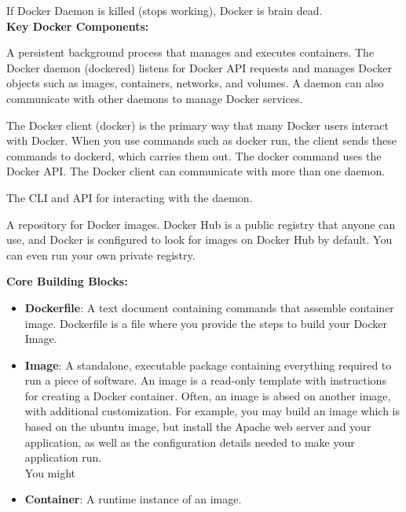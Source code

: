 \documentclass{article}
\begin{document}
If Docker Daemon is killed (stops working), Docker is brain dead. \\
\textbf{Key Docker Components:} 

\begin{tcolorbox}[colback=red!5!white, colframe=red!50!black,title=Docker Daemon]
    A persistent background process that manages and executes containers. The Docker daemon (dockered) listens for Docker API requests and manages Docker objects such as images, containers, networks, and volumes. A daemon can also communicate with other daemons to manage Docker services.
\end{tcolorbox}
\begin{tcolorbox}[colback=red!5!white, colframe=red!50!black,title=Docker Client] The Docker client (docker) is the primary way that many Docker users interact with Docker. When you use commands such as docker run, the client sends these commands to dockerd, which carries them out. The docker command uses the Docker API. The Docker client can communicate with more than one daemon.
\end{tcolorbox}
\begin{tcolorbox}[colback=red!5!white, colframe=red!50!black,title=Docker Engine] 
The CLI and API for interacting with the daemon.
\end{tcolorbox}
\begin{tcolorbox}[colback=red!5!white, colframe=red!50!black,title=Docker Registry]
A repository for Docker images. Docker Hub is a public registry that anyone can use, and Docker is configured to look for images on Docker Hub by default. You can even run your own private registry.
\end{tcolorbox}


\textbf{Core Building Blocks:} 
\begin{itemize}
\color{blue}
\item \textbf{Dockerfile}: A text document containing commands that assemble container image. Dockerfile is a file where you provide the steps to build your Docker Image.
\item \textbf{Image}: A standalone, executable package containing everything required to run a piece of software. An image is a read-only template with instructions for creating a Docker container. Often, an image is absed on another image, with additional customization. For example, you may build an image which is based on the ubuntu image, but install the Apache web server and your application, as well as the configuration details needed to make your application run. \\
You might 
\item \textbf{Container}: A runtime instance of an image.
\end{itemize}
\end{document}
